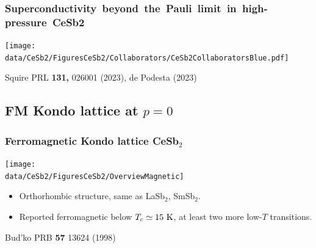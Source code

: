 


\begin{frame}[plain,label=CeSb2Grouplist]
    \frametitle {\mbox{Superconductivity beyond the Pauli limit in high-pressure CeSb2}}
    \texttt{[image: \\data/CeSb2/FiguresCeSb2/Collaborators/CeSb2CollaboratorsBlue.pdf]}
    \vfill
\centerline{\makebox[\linewidth]{\rule{0.85\textwidth}{0.4pt}}}

\centerline{\scriptsize Squire PRL {\bf 131,} 026001 (2023), de Podesta (2023)}

    \end{frame}
    
     


\subsection{FM Kondo lattice at $p=0$}
\begin{frame}[label=CeSb2Intro]
\frametitle{Ferromagnetic Kondo lattice CeSb$_2$}
\centerline{\texttt{[image: \\data/CeSb2/FiguresCeSb2/OverviewMagnetic]}}

\vspace{1.5em}
\begin{itemize}
\item Orthorhombic structure, same as LaSb$_2$, SmSb$_2$.

\item Reported ferromagnetic below $T_c \simeq 15~\rm K$, at least two more low-$T$ transitions.
%
\end{itemize}

\vspace{3 em}
\centerline{\makebox[\linewidth]{\rule{0.85\textwidth}{0.4pt}}}

\centerline{\scriptsize Bud'ko PRB {\bf 57} 13624 (1998)}
\end{frame}


